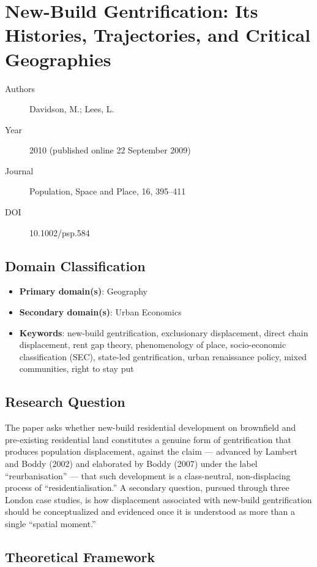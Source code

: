 \section{New-Build Gentrification: Its Histories, Trajectories, and Critical Geographies}

\begin{description}
  \item[Authors] Davidson, M.; Lees, L.
  \item[Year] 2010 (published online 22 September 2009)
  \item[Journal] Population, Space and Place, 16, 395--411
  \item[DOI] 10.1002/psp.584
\end{description}

\subsection*{Domain Classification}

\begin{itemize}
  \item \textbf{Primary domain(s)}: Geography
  \item \textbf{Secondary domain(s)}: Urban Economics
  \item \textbf{Keywords}: new-build gentrification, exclusionary displacement, direct chain displacement, rent gap theory, phenomenology of place, socio-economic classification (SEC), state-led gentrification, urban renaissance policy, mixed communities, right to stay put
\end{itemize}

\subsection*{Research Question}

The paper asks whether new-build residential development on brownfield and pre-existing residential land constitutes a genuine form of gentrification that produces population displacement, against the claim --- advanced by Lambert and Boddy (2002) and elaborated by Boddy (2007) under the label ``reurbanisation'' --- that such development is a class-neutral, non-displacing process of ``residentialisation.'' A secondary question, pursued through three London case studies, is how displacement associated with new-build gentrification should be conceptualized and evidenced once it is understood as more than a single ``spatial moment.''

\subsection*{Theoretical Framework}

